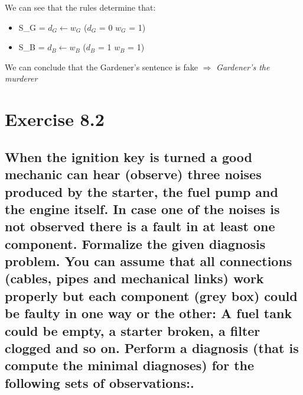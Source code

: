 \documentclass[paper=a4, fontsize=11pt]{scrartcl} %
\numberwithin{equation}{section} %
\numberwithin{figure}{section} %
\numberwithin{table}{section} %
\begin{document}
We can see that the rules determine that:

\begin{itemize}
\item S\_G  	= $d_G \leftarrow w_G$ \hspace{4cm} ($d_G$ = 0 $w_G$ = 1)
\item S\_B 	= $d_B \leftarrow w_B$ \hspace{4cm} ($d_B$ = 1 $w_B$ = 1)\\

\end{itemize}
We can conclude that the Gardener's sentence is fake $\Rightarrow$ \textit{Gardener's the murderer}


\newpage

\section*{Exercise 8.2}
\subsection*{When the ignition key is turned a good mechanic can hear (observe) three noises produced by the starter, the fuel pump and the engine itself. In case one of the noises is not observed there is a fault in at least one component. Formalize the given diagnosis problem. You can assume that all connections (cables, pipes and mechanical links) work properly but each component (grey box) could be faulty in one way or the other: A fuel tank could be empty, a starter broken, a filter clogged and so on. Perform a diagnosis (that is compute the minimal diagnoses) for the following sets of observations:. }
\end{document}
